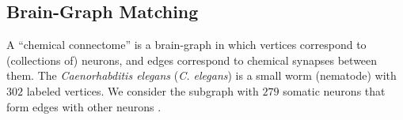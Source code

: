 \documentclass[11pt]{article}
\begin{document}



% 



\subsection{Brain-Graph Matching} %
\label{sub:connectome_classification}

A ``chemical connectome'' is a brain-graph in which vertices correspond to (collections of) neurons, and edges correspond to chemical synapses between them. The \emph{Caenorhabditis elegans} (\emph{C. elegans}) is a small worm (nematode) with $302$ labeled vertices.  We consider the subgraph with $279$ somatic neurons that form edges with other neurons \cite{WhiteBrenner86, Varshney2011}.  
\end{document}
